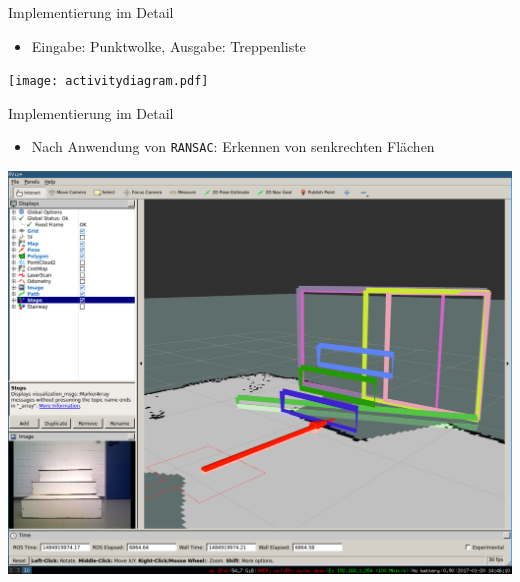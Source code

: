 \documentclass[18pt]{beamer}
\begin{document}
\begin{frame}{Implementierung im Detail}
	\begin{itemize}
		\item Eingabe: Punktwolke, Ausgabe: Treppenliste
	\end{itemize}
	\begin{center}
		\texttt{[image: activitydiagram.pdf]}
	\end{center}
\end{frame}

\begin{frame}{Implementierung im Detail}
	\begin{itemize}
		\item Nach Anwendung von \texttt{RANSAC}: Erkennen von senkrechten Flächen
	\end{itemize}
	\begin{center}
		\includegraphics[scale=0.16]{images/ransac01.pdf}
	\end{center}
\end{frame}
\end{document}
